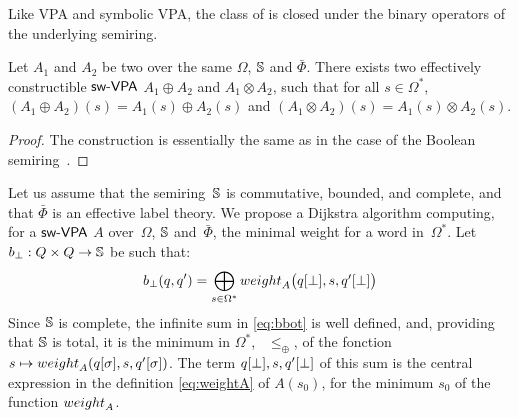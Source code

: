 \medskip\noindent
Like VPA and symbolic VPA, 
the class of \SWVPA is closed under the binary operators of the underlying semiring.
%
\begin{proposition}\label{prop:SWVPA-product}
Let $A_1$ and $A_2$ be two \SWVPA
over the same $\Omega$, $\mathbb{S}$ and $\bar\Phi$.
There exists two effectively constructible $\textsf{sw-VPA}$ 
$A_1 \oplus A_2$ and $A_1 \otimes A_2$,  
such that for all $s \in \Omega^*$, 
$(A_1 \oplus A_2)(s) = A_1(s) \oplus A_2(s)$ and 
$(A_1 \otimes A_2)(s) = A_1(s) \otimes A_2(s)$.
\end{proposition}
%
\begin{proof}
The construction is essentially the same 
as in the case of the Boolean semiring~\cite{dAntonyAlur14SVPDA}.
\end{proof}


\label{sec:best}\label{sec:search}
\noindent
Let us assume that the semiring~$\mathbb{S}$ is
commutative, bounded, and complete,  
and that $\bar\Phi$ is an effective label theory.
% 
%
We propose a Dijkstra algorithm computing, for a $\textsf{sw-VPA}$ $A$
over~$\Omega$, $\mathbb{S}$ and~$\bar\Phi$, 
the minimal weight %
for a word in~$\Omega^*$.
%
\noindent
Let $b_\bot : Q \times Q \to \mathbb{S}$ be such that: %
%
\begin{equation}\label{eq:bbot}
  b_\bot(q, q') = \bigoplus_{s\in \Omega^*} 
  \textstyle
  \weight_A\bigl(\config{q}{\bot}, s, \config{q'}{\bot}\bigr)
\end{equation}
%
Since $\mathbb{S}$ is complete, the infinite sum in \eqref{eq:bbot} is well defined,
and, providing that $\mathbb{S}$ is total, it is the minimum in $\Omega^*$,
\wrt~$\leq_\oplus$, %
of the fonction 
$s \mapsto \weight_A(\config{q}{\sigma}, s, \config{q'}{\sigma})$.
%
The term $q[{\bot}], s, q'[{\bot}]$ 
of this sum is the central expression in 
the definition \eqref{eq:weightA} of $A(s_0)$, for the minimum $s_0$
of the function $\weight_A$.

